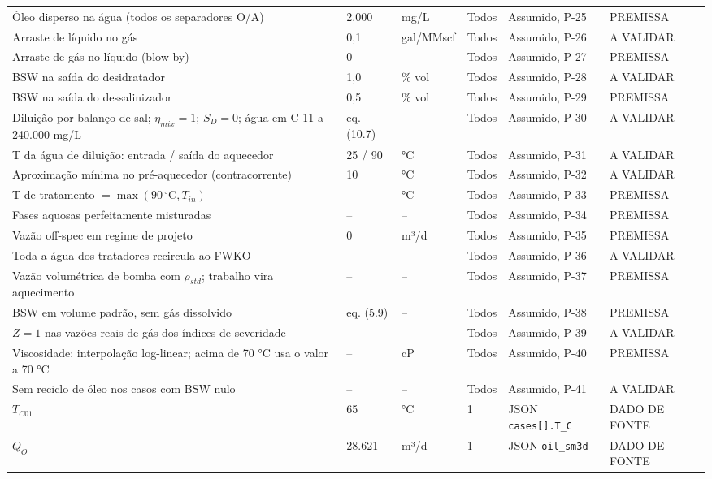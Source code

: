 \documentclass[11pt,a4paper]{article}
\numberwithin{equation}{section}
\numberwithin{table}{section}
\numberwithin{figure}{section}
\newcommand{\tipo}[1]{\textsf{\footnotesize #1}}
\newcommand{\AV}{\textcolor{red!70!black}{\tipo{A VALIDAR}}}
\begin{document}
{\begin{longtable}{L{3.6cm}L{2.2cm}lL{1.0cm}L{4.2cm}l}
Óleo disperso na água (todos os separadores O/A) & 2.000 & mg/L & Todos & Assumido, P-25 & \tipo{PREMISSA}\\
Arraste de líquido no gás & 0,1 & gal/MMscf & Todos & Assumido, P-26 & \AV\\
Arraste de gás no líquido (blow-by) & 0 & -- & Todos & Assumido, P-27 & \tipo{PREMISSA}\\
BSW na saída do desidratador & 1{,}0 & \% vol & Todos & Assumido, P-28 & \AV\\
BSW na saída do dessalinizador & 0{,}5 & \% vol & Todos & Assumido, P-29 & \tipo{PREMISSA}\\
Diluição por balanço de sal; $\eta_{mix}=1$; $S_D=0$; água em C-11 a 240.000 mg/L & eq. (10.7) & -- & Todos & Assumido, P-30 & \AV\\
T da água de diluição: entrada / saída do aquecedor & 25 / 90 & °C & Todos & Assumido, P-31 & \AV\\
Aproximação mínima no pré-aquecedor (contracorrente) & 10 & °C & Todos & Assumido, P-32 & \AV\\
T de tratamento $=\max(90\,^\circ\mathrm{C},T_{in})$ & -- & °C & Todos & Assumido, P-33 & \tipo{PREMISSA}\\
Fases aquosas perfeitamente misturadas & -- & -- & Todos & Assumido, P-34 & \tipo{PREMISSA}\\
Vazão off-spec em regime de projeto & 0 & m³/d & Todos & Assumido, P-35 & \tipo{PREMISSA}\\
Toda a água dos tratadores recircula ao FWKO & -- & -- & Todos & Assumido, P-36 & \AV\\
Vazão volumétrica de bomba com $\rho_{std}$; trabalho vira aquecimento & -- & -- & Todos & Assumido, P-37 & \tipo{PREMISSA}\\
BSW em volume padrão, sem gás dissolvido & eq. (5.9) & -- & Todos & Assumido, P-38 & \tipo{PREMISSA}\\
$Z=1$ nas vazões reais de gás dos índices de severidade & -- & -- & Todos & Assumido, P-39 & \AV\\
Viscosidade: interpolação log-linear; acima de 70 °C usa o valor a 70 °C & -- & cP & Todos & Assumido, P-40 & \tipo{PREMISSA}\\
Sem reciclo de óleo nos casos com BSW nulo & -- & -- & Todos & Assumido, P-41 & \AV\\
$T_{C01}$ & 65 & °C & 1 & JSON \texttt{cases[].T\_C} & \tipo{DADO DE FONTE}\\
$Q_{O}$ & 28.621 & m³/d & 1 & JSON \texttt{oil\_sm3d} & \tipo{DADO DE FONTE}\\

\end{longtable}}
\end{document}
